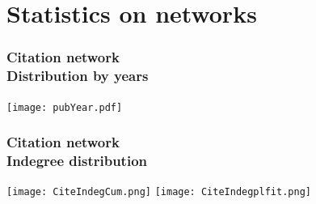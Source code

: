 \documentclass[hyperref={pdfstartview={FitBH -32768},
                         pdfpagemode=FullScreen,
                         plainpages=false,
                         colorlinks=true}
              ]{beamer}
\begin{document}
\section{Statistics on networks}


\begin{frame}[fragile]
\frametitle{Citation network\label{maxin}\\ \normalsize Distribution by years}
\begin{center}
\texttt{[image: pubYear.pdf]}
\end{center}
\end{frame}


\begin{frame}[fragile]
\frametitle{Citation network\label{maxin}\\ \normalsize Indegree distribution}

\begin{center}
\texttt{[image: CiteIndegCum.png]}
\texttt{[image: CiteIndegplfit.png]}
\end{center}

\end{frame}
\end{document}
